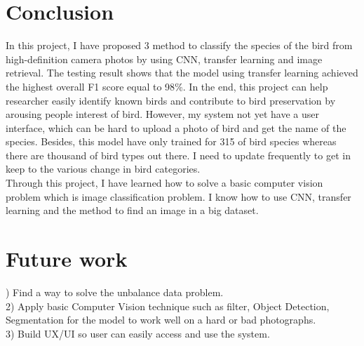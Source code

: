 \documentclass[runningheads]{llncs}
\begin{document}
\section{Conclusion}
In this project, I have proposed 3 method to classify the species of the bird from high-definition camera photos by using CNN, transfer learning and image retrieval. The testing result shows that the model using transfer learning achieved the highest overall F1 score equal to 98$\%$. In the end, this project can help researcher easily identify known birds and contribute to bird preservation by arousing people interest of bird. However, my system not yet have a user interface, which can be hard to upload a photo of bird and get the name of the species. Besides, this model have only trained for 315 of bird species whereas there are thousand of bird types out there. I need to update frequently to get in keep to the various change in bird categories.\\
Through this project, I have learned how to solve a basic computer vision problem which is image classification problem. I know how to use CNN, transfer learning and the method to find an image in a big dataset. 
\section{Future work}
) Find a way to solve the unbalance data problem.\\
2) Apply basic Computer Vision technique such as filter, Object Detection, Segmentation for the model to work well on a hard or bad photographs.\\
3) Build UX/UI so user can easily access and use the system.

\printbibliography
\end{document}
